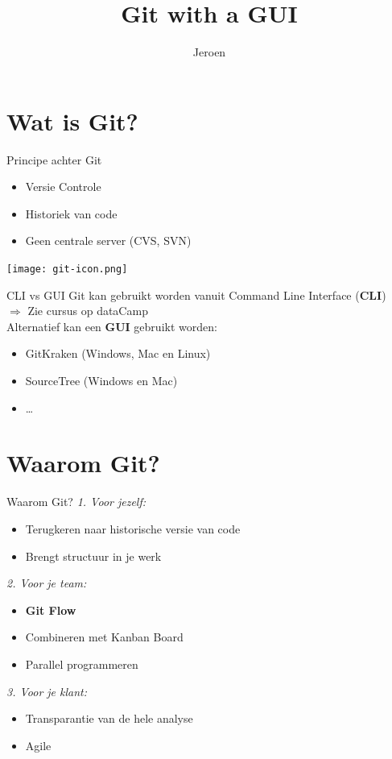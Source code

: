 \documentclass[11pt]{beamer}
\author{Jeroen}
\title{Git with a GUI}
\begin{document}
\begin{frame}
\titlepage
\end{frame}


\section{Wat is Git?}
\begin{frame}{Principe achter Git}
\begin{itemize}
\item Versie Controle
\item Historiek van code
\item Geen centrale server (CVS, SVN)
\end{itemize}
\hspace{200pt}
\texttt{[image: git-icon.png]}
\end{frame}

\begin{frame}{CLI vs GUI}
Git kan gebruikt worden vanuit Command Line Interface (\textbf{CLI})\\
$\Rightarrow$ Zie cursus op dataCamp\\
\vspace{12pt}
Alternatief kan een \textbf{GUI} gebruikt worden:
\begin{itemize}
\item GitKraken (Windows, Mac en Linux)
\item SourceTree (Windows en Mac)
\item \dots
\end{itemize}
\end{frame}

\section{Waarom Git?}
\begin{frame}{Waarom Git?}
\emph{1. Voor jezelf:}
\begin{itemize}
\item Terugkeren naar historische versie van code
\item Brengt structuur in je werk
\end{itemize}
\emph{2. Voor je team:}
\begin{itemize}
\item \textbf{Git Flow}
\item Combineren met Kanban Board
\item Parallel programmeren
\end{itemize}
\emph{3. Voor je klant:}
\begin{itemize}
\item Transparantie van de hele analyse
\item Agile
\end{itemize}
\end{frame}
\end{document}
